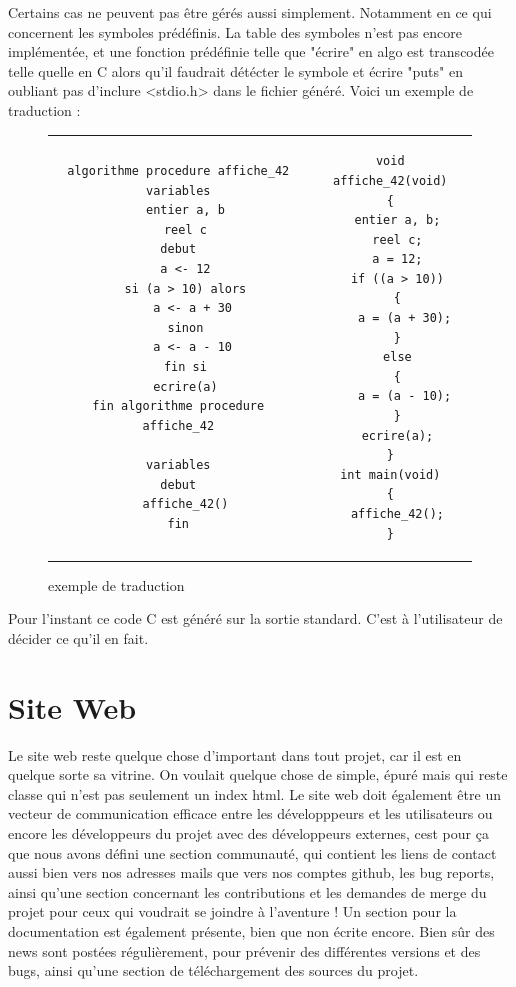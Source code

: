 \documentclass[12pt,a4paper]{report}
\begin{document}
Certains cas ne peuvent pas être gérés aussi simplement. Notamment en ce qui concernent les symboles prédéfinis. La table des symboles n'est pas encore implémentée, et une fonction prédéfinie telle que "écrire" en algo est transcodée telle quelle en C alors qu'il faudrait détécter le symbole et écrire "puts" en oubliant pas d'inclure <stdio.h> dans le fichier généré. Voici un exemple de traduction :\\

\begin{figure}[h]
\begin{tabular}{|c|c|}
  \begin{lstlisting}[style=algo]
algorithme procedure affiche_42
variables
  entier a, b
  reel c
debut
  a <- 12
  si (a > 10) alors
    a <- a + 30
  sinon
    a <- a - 10
  fin si
  ecrire(a)
fin algorithme procedure affiche_42

variables
debut
  affiche_42()
fin
  \end{lstlisting}
  &
  \begin{lstlisting}[style=base]
void affiche_42(void)
{
  entier a, b;
  reel c;
  a = 12;
  if ((a > 10))
  {
    a = (a + 30);
  }
  else
  {
    a = (a - 10);
  }
  ecrire(a);
}
int main(void)
{
  affiche_42();
}

  \end{lstlisting}
\end{tabular}
\label{exemple}
\caption{exemple de traduction}
\end{figure}

Pour l'instant ce code C est généré sur la sortie standard. C'est à l'utilisateur de décider ce qu'il en fait.

\newpage

\section{Site Web}
Le site web reste quelque chose d'important dans tout projet, car il est en quelque sorte sa vitrine.
On voulait quelque chose de simple, épuré mais qui reste classe qui n'est pas seulement un index html.
Le site web doit également être un vecteur de communication efficace entre les développpeurs et les utilisateurs ou encore les développeurs du projet avec des développeurs externes, cest pour ça que nous avons défini une section communauté, qui contient  les liens de contact aussi bien vers nos adresses mails que vers nos comptes github, les bug reports, ainsi qu'une section concernant les contributions et les demandes de merge du projet pour ceux qui voudrait se joindre à l'aventure !
Un section pour la documentation est également présente, bien que non écrite encore.
Bien sûr des news sont postées régulièrement, pour prévenir des différentes versions et des bugs, ainsi qu'une section de téléchargement des sources du projet.
\newline
\newline
\end{document}
